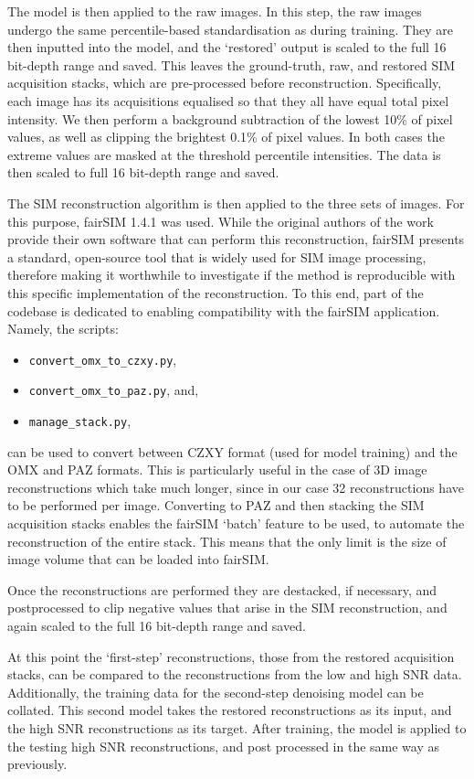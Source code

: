 \documentclass[12pt]{article}
\begin{document}
The model is then applied to the raw images.
In this step, the raw images undergo the same percentile-based standardisation as during training.
They are then inputted into the model, and the `restored' output is scaled to the full 16 bit-depth range and saved.
This leaves the ground-truth, raw, and restored SIM acquisition stacks,
which are pre-processed before reconstruction.
Specifically, each image has its acquisitions equalised so that they all have equal total pixel intensity.
We then perform a background subtraction of the lowest 10\% of pixel values, as well as clipping the brightest 0.1\% of pixel values.
In both cases the extreme values are masked at the threshold percentile intensities.
The data is then scaled to full 16 bit-depth range and saved.

The SIM reconstruction algorithm is then applied to the three sets of images.
For this purpose, fairSIM 1.4.1 \cite{fairSIM} was used.
While the original authors of the work provide their own software that can perform this reconstruction,
fairSIM presents a standard, open-source tool that is widely used for SIM image processing,
therefore making it worthwhile to investigate if the method is reproducible with this specific implementation of the reconstruction.
To this end, part of the codebase is dedicated to enabling compatibility with the fairSIM application.
Namely, the scripts:
\begin{itemize}
    \item \texttt{convert\_omx\_to\_czxy.py},
    \item \texttt{convert\_omx\_to\_paz.py}, and,
    \item \texttt{manage\_stack.py},
\end{itemize}
can be used to convert between CZXY format (used for model training) and the OMX and PAZ formats.
This is particularly useful in the case of 3D image reconstructions which take much longer,
since in our case 32 reconstructions have to be performed per image.
Converting to PAZ and then stacking the SIM acquisition stacks enables the fairSIM `batch' feature to be used,
to automate the reconstruction of the entire stack.
This means that the only limit is the size of image volume that can be loaded into fairSIM.

Once the reconstructions are performed they are destacked, if necessary, and postprocessed to clip negative values that arise in the SIM reconstruction,
and again scaled to the full 16 bit-depth range and saved.

At this point the `first-step' reconstructions, those from the restored acquisition stacks,
can be compared to the reconstructions from the low and high SNR data.
Additionally, the training data for the second-step denoising model can be collated.
This second model takes the restored reconstructions as its input, and the high SNR reconstructions as its target.
After training, the model is applied to the testing high SNR reconstructions, and post processed in the same way as previously.
\end{document}
